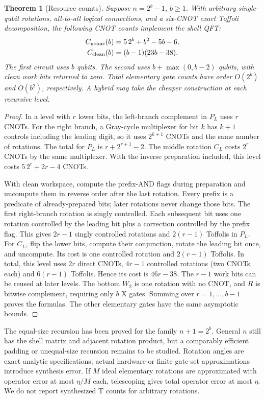 \documentclass[11pt]{article}
\newtheorem{theorem}{Theorem}
\begin{document}
\begin{theorem}[Resource counts]\label{thm:cost}
Suppose $n=2^b-1$, $b\ge1$. With arbitrary single-qubit rotations, all-to-all logical connections, and a six-CNOT exact Toffoli decomposition, the following CNOT counts implement the shell QFT:
\begin{align}
 C_{\rm noanc}(b)&=5\,2^b+b^2-5b-6,\\
 C_{\rm clean}(b)&=(b-1)(23b-38).
\end{align}
The first circuit uses $b$ qubits. The second uses $b+\max(0,b-2)$ qubits, with clean work bits returned to zero. Total elementary gate counts have order $O(2^b)$ and $O(b^2)$, respectively. A hybrid may take the cheaper construction at each recursive level.
\end{theorem}
\begin{proof}
In a level with $r$ lower bits, the left-branch complement in $P_L$ uses $r$ CNOTs. For the right branch, a Gray-cycle multiplexer for bit $k$ has $k+1$ controls including the leading digit, so it uses $2^{k+1}$ CNOTs and the same number of rotations. The total for $P_L$ is $r+2^{r+1}-2$. The middle rotation $C_L$ costs $2^r$ CNOTs by the same multiplexer. With the inverse preparation included, this level costs $5\,2^r+2r-4$ CNOTs.

With clean workspace, compute the prefix-AND flags during preparation and uncompute them in reverse order after the last rotation. Every prefix is a predicate of already-prepared bits; later rotations never change those bits. The first right-branch rotation is singly controlled. Each subsequent bit uses one rotation controlled by the leading bit plus a correction controlled by the prefix flag. This gives $2r-1$ singly controlled rotations and $2(r-1)$ Toffolis in $P_L$. For $C_L$, flip the lower bits, compute their conjunction, rotate the leading bit once, and uncompute. Its cost is one controlled rotation and $2(r-1)$ Toffolis. In total, this level uses $2r$ direct CNOTs, $4r-1$ controlled rotations (two CNOTs each) and $6(r-1)$ Toffolis. Hence its cost is $46r-38$. The $r-1$ work bits can be reused at later levels. The bottom $W_2$ is one rotation with no CNOT, and $R$ is bitwise complement, requiring only $b$ X gates. Summing over $r=1,\ldots,b-1$ proves the formulas. The other elementary gates have the same asymptotic bounds.
\end{proof}
The equal-size recursion has been proved for the family $n+1=2^b$. General $n$ still has the shell matrix and adjacent rotation product, but a comparably efficient padding or unequal-size recursion remains to be studied. Rotation angles are exact analytic specifications; actual hardware or finite gate-set approximations introduce synthesis error. If $M$ ideal elementary rotations are approximated with operator error at most $\eta/M$ each, telescoping gives total operator error at most $\eta$. We do not report synthesized T counts for arbitrary rotations.
\end{document}
